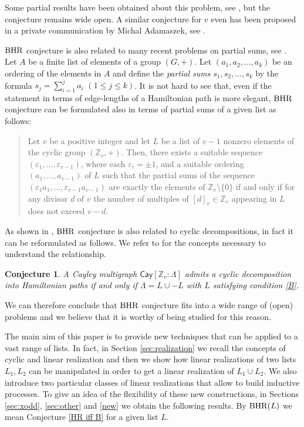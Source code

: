 \documentclass{amsart}
\newtheorem{conj}[prop]{Conjecture}
\theoremstyle{definition}
\numberwithin{equation}{section}
\def\Cay{\mathsf{Cay}}
\def\Z{\mathbb{Z}}
\def\BHR{\mathop{\rm BHR}}
\def\eps{\varepsilon}
\begin{document}
Some partial results have been obtained about this problem, see \cite{PPMeszka,R},
but the conjecture remains wide open. A similar conjecture for $v$ even has been
proposed in a private communication by Michal Adamaszek, see \cite{KP,KC}.

$\BHR$ conjecture is also related to many recent problems on partial sums, see \cite{AL, ADMS,CMPPSums, CP, HOS, O}.
Let $A$ be a finite list of elements of a group $(G,+)$.
Let $(a_1,a_2,\ldots,a_k)$ be an ordering of the elements in $A$ and define the \emph{partial sums}
$s_1,s_2,\ldots,s_k$ by the formula $s_j=\sum\limits_{i=1}^{j} a_i$ $(1\leq j \leq k)$.
It is not hard to see that, even if the
statement in terms of edge-lengths of a Hamiltonian path is more elegant, $\BHR$ conjecture can be formulated also in terms of partial sums of a given list
as follows:
\begin{quote}
Let $v$ be a positive integer and let $L$ be a list of $v-1$ nonzero elements of the cyclic group $(\Z_v,+)$. Then,
there exists a suitable sequence $(\eps_1,\ldots,\eps_{v-1})$, where each $\eps_i=\pm1$, and a suitable ordering
$(a_1,\ldots,a_{v-1})$ of $L$ such that the partial sums of the sequence $(\eps_1a_1,\ldots,\eps_{v-1}a_{v-1})$
are exactly the elements of $\Z_v\setminus\{0\}$ if and only if for any divisor $d$ of $v$ the number of multiples of 
$[d]_v \in \Z_v$ appearing in $L$
does not exceed $v-d$.
\end{quote}
As shown in \cite{PP1}, $\BHR$ conjecture is also related to cyclic decompositions, in fact it can be reformulated as follows.
We refer to \cite{BP} for the concepts necessary to understand the relationship.

\begin{conj}
A Cayley multigraph $\Cay[\Z_v:\Lambda]$ admits a cyclic decomposition into Hamiltonian paths if and only if
$\Lambda=L\cup -L$ with $L$ satisfying condition \eqref{B}.
\end{conj}

We can therefore conclude that $\BHR$ conjecture fits into a wide range of (open) problems and we believe that it is
worthy of being studied  for this reason.

The main aim of this paper is to provide new techniques that can be applied to a vast range of lists.
In fact, in Section \ref{sec:realization} we recall the concepts of cyclic and linear realization and then
we show how linear realizations of two lists $L_1,L_2$ can be manipulated in order to get a linear realization
of $L_1\cup L_2$.
We also introduce two particular classes of linear realizations that allow to build inductive processes.
To give an idea of the flexibility of these new constructions, in Sections \ref{sec:xodd}, \ref{sec:other} and \ref{new}
we obtain the following results. By  $\BHR(L)$ we mean  Conjecture \ref{HR iff B} for a given list $L$.
\end{document}
